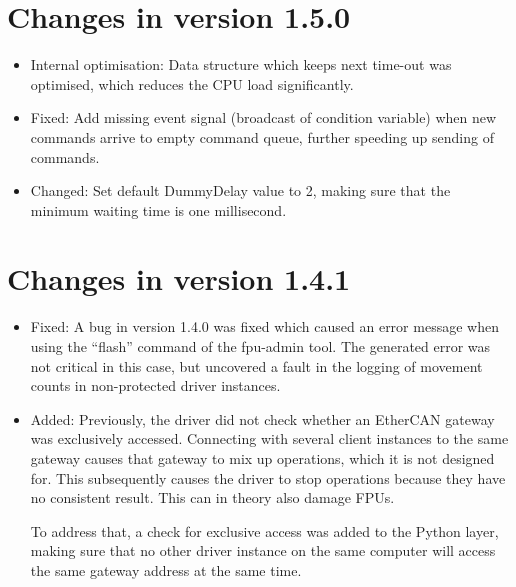 \documentclass[fontsize=12,a4paper]{scrreprt}
\begin{document}
\section*{Changes in version 1.5.0}
\begin{itemize}

\item  Internal optimisation: Data structure which keeps next time-out was optimised, which reduces
  the CPU load significantly.

\item Fixed: Add missing event signal (broadcast of condition variable) when new commands arrive
  to empty command queue, further speeding up sending of commands.

\item Changed: Set default DummyDelay value to 2, making sure that the
  minimum waiting time is one millisecond.

\end{itemize}


\section*{Changes in version 1.4.1}
\begin{itemize}


\item Fixed: A bug in version 1.4.0 was fixed which caused an error
  message when using the ``flash'' command of the fpu-admin tool. The
  generated error was not critical in this case, but uncovered a fault
  in the logging of movement counts in non-protected driver instances.

\item Added: Previously, the driver did not check whether an EtherCAN
  gateway was exclusively accessed. Connecting with several client
  instances to the same gateway causes that gateway to mix up
  operations, which it is not designed for. This subsequently causes
  the driver to stop operations because they have no consistent
  result. This can in theory also damage FPUs.

  To address that, a check for exclusive access was added to the
  Python layer, making sure that no other driver instance on the same
  computer will access the same gateway address at the same time.

\end{itemize}
\end{document}
